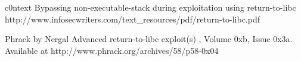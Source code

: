 %
%

%


\begin{thebibliography}{10}

c0ntext
\newblock Bypassing non-executable-stack during exploitation using return-to-libc
\newblock http://www.infosecwriters.com/text\_resources/pdf/return-to-libc.pdf 

Phrack by Nergal
\newblock Advanced return-to-libc exploit(s) 
, Volume 0xb, Issue 0x3a. Available at
				http://www.phrack.org/archives/58/p58-0x04
\end{thebibliography}

